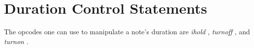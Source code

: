 \begin{comment}
\documentclass[10pt]{article}
\usepackage{fullpage, graphicx, url}
\setlength{\parskip}{1ex}
\setlength{\parindent}{0ex}
\title{Duration Control Statements}



\begin{tabular}{ccc}
The Alternative Csound Reference Manual & & \\
Previous &Instrument Control &Next

\end{tabular}

\end{comment}
\section{Duration Control Statements}


  The opcodes one can use to manipulate a note's duration are \emph{ihold}
, \emph{turnoff}
, and \emph{turnon}
. 


\begin{comment}
\begin{tabular}{lcr}
Previous &Home &Next \\
Conditional Values &Up &Introduction to FLTK Widgets and GUI controllers

\end{tabular}



\end{comment}
